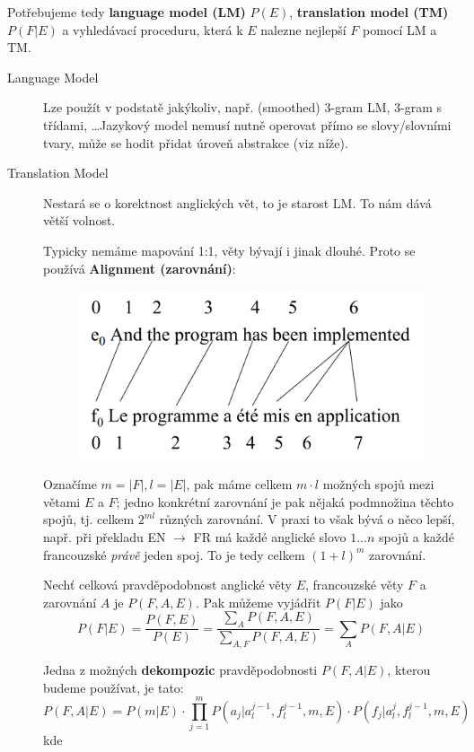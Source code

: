 \documentclass[11pt]{report} %
\numberwithin{equation}{section}
\begin{document}
Potřebujeme tedy \textbf{language model (LM)} $P(E)$, \textbf{translation model (TM)} $P(F|E)$ a vyhledávací proceduru, která k $E$ nalezne nejlepší $F$ pomocí LM a TM. 
\begin{description}
	\item[Language Model] Lze použít v podstatě jakýkoliv, např. (smoothed) 3-gram LM, 3-gram s třídami, \dots Jazykový model nemusí nutně operovat přímo se slovy/slovními tvary, může se hodit přidat úroveň abstrakce (viz níže).
	
	\item[Translation Model] Nestará se o korektnost anglických vět, to je starost LM. To nám dává větší volnost.
	
	Typicky nemáme mapování 1:1, věty bývají i jinak dlouhé. Proto se používá \textbf{Alignment (zarovnání)}:
	
	\begin{figure}[H]
		\centering
		\includegraphics[scale = 1]{img/translation_alignment.png}
	\end{figure}

	Označíme $m = |F|, l = |E|$, pak máme celkem $m\cdot l$ možných spojů mezi větami $E$ a $F$; jedno konkrétní zarovnání je pak nějaká podmnožina těchto spojů, tj. celkem $2^{ml}$ různých zarovnání. V praxi to však bývá o něco lepší, např. při překladu EN $\rightarrow$ FR má každé anglické slovo $1\dots n$ spojů a každé francouzské \textit{právě} jeden spoj. To je tedy celkem  $(1+l)^m$ zarovnání.
	
	Nechť celková pravděpodobnost anglické věty $E$, francouzské věty $F$ a zarovnání $A$ je $P(F,A,E)$. Pak můžeme vyjádřit $P(F|E)$ jako
	$$P(F|E) = \frac{P(F,E)}{P(E)} = \frac{\sum_A P(F,A,E)}{\sum_{A,F} P(F,A,E)} = \sum_A P(F,A |E) $$
	
	Jedna z možných \textbf{dekompozic} pravděpodobnosti $P(F,A|E)$, kterou budeme používat, je tato:
	$$P(F,A|E) = P(m|E) \cdot \prod\limits_{j=1}^{m} P(a_j | a_l^{j-1}, f_l^{j-1}, m, E) \cdot P(f_j | a_l^j, f_l^{j-1}, m, E)$$
	kde
	\begin{itemize}
		

\end{itemize}
\end{description}
\end{document}
